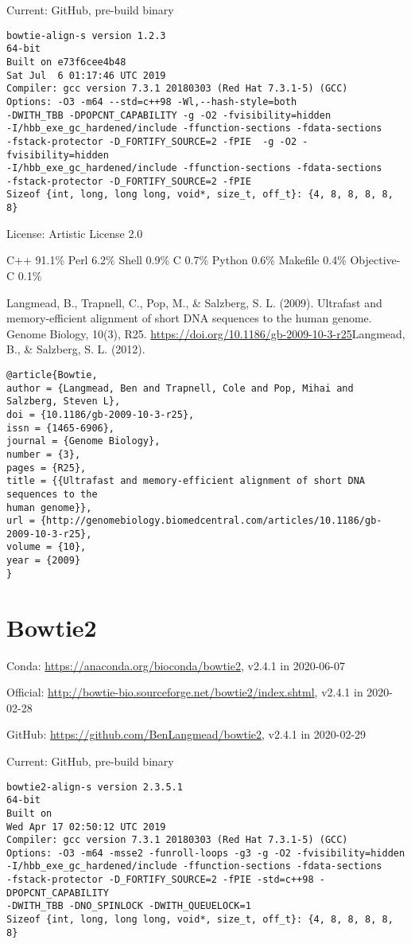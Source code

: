 \documentclass[]{article}
\begin{document}
Current: GitHub, pre-build binary

\begin{verbatim}
bowtie-align-s version 1.2.3
64-bit
Built on e73f6cee4b48
Sat Jul  6 01:17:46 UTC 2019
Compiler: gcc version 7.3.1 20180303 (Red Hat 7.3.1-5) (GCC)
Options: -O3 -m64 --std=c++98 -Wl,--hash-style=both
-DWITH_TBB -DPOPCNT_CAPABILITY -g -O2 -fvisibility=hidden
-I/hbb_exe_gc_hardened/include -ffunction-sections -fdata-sections
-fstack-protector -D_FORTIFY_SOURCE=2 -fPIE  -g -O2 -fvisibility=hidden
-I/hbb_exe_gc_hardened/include -ffunction-sections -fdata-sections
-fstack-protector -D_FORTIFY_SOURCE=2 -fPIE
Sizeof {int, long, long long, void*, size_t, off_t}: {4, 8, 8, 8, 8, 8}
\end{verbatim}

License: Artistic License 2.0

C++ 91.1\% Perl 6.2\% Shell 0.9\% C 0.7\% Python 0.6\% Makefile 0.4\% Objective-C 0.1\%

Langmead, B., Trapnell, C., Pop, M., \& Salzberg, S. L. (2009). Ultrafast and memory-efficient alignment of short DNA sequences to the human genome. Genome Biology, 10(3), R25. \url{https://doi.org/10.1186/gb-2009-10-3-r25}Langmead, B., \& Salzberg, S. L. (2012).

\begin{verbatim}
@article{Bowtie,
author = {Langmead, Ben and Trapnell, Cole and Pop, Mihai and Salzberg, Steven L},
doi = {10.1186/gb-2009-10-3-r25},
issn = {1465-6906},
journal = {Genome Biology},
number = {3},
pages = {R25},
title = {{Ultrafast and memory-efficient alignment of short DNA sequences to the
human genome}},
url = {http://genomebiology.biomedcentral.com/articles/10.1186/gb-2009-10-3-r25},
volume = {10},
year = {2009}
}
\end{verbatim}

\section{Bowtie2}

Conda: \url{https://anaconda.org/bioconda/bowtie2}, v2.4.1 in 2020-06-07

Official: \url{http://bowtie-bio.sourceforge.net/bowtie2/index.shtml}, v2.4.1 in 2020-02-28

GitHub: \url{https://github.com/BenLangmead/bowtie2}, v2.4.1 in 2020-02-29

Current: GitHub, pre-build binary

\begin{verbatim}
bowtie2-align-s version 2.3.5.1
64-bit
Built on
Wed Apr 17 02:50:12 UTC 2019
Compiler: gcc version 7.3.1 20180303 (Red Hat 7.3.1-5) (GCC)
Options: -O3 -m64 -msse2 -funroll-loops -g3 -g -O2 -fvisibility=hidden
-I/hbb_exe_gc_hardened/include -ffunction-sections -fdata-sections
-fstack-protector -D_FORTIFY_SOURCE=2 -fPIE -std=c++98 -DPOPCNT_CAPABILITY
-DWITH_TBB -DNO_SPINLOCK -DWITH_QUEUELOCK=1
Sizeof {int, long, long long, void*, size_t, off_t}: {4, 8, 8, 8, 8, 8}
\end{verbatim}
\end{document}
